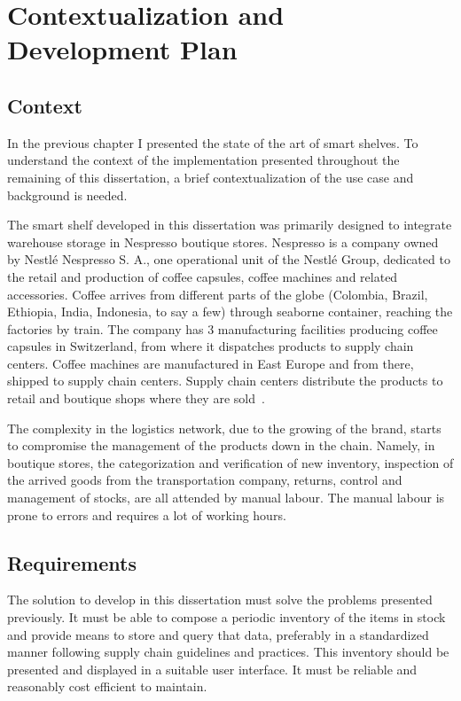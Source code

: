 \chapter{Contextualization and Development Plan}

\section{Context}

In the previous chapter I presented the state of the art of smart shelves. 
To understand the context of the implementation presented throughout the remaining of this dissertation, a brief contextualization of the use case and background is needed.

The smart shelf developed in this dissertation was primarily designed to integrate warehouse storage in Nespresso boutique stores.
Nespresso is a company owned by Nestlé Nespresso S. A., one operational unit of the Nestlé Group, dedicated to the retail and production of coffee capsules, coffee machines and related accessories.
Coffee arrives from different parts of the globe (Colombia, Brazil, Ethiopia, India, Indonesia, to say a few) through seaborne container, reaching the factories by train.
The company has 3 manufacturing facilities producing coffee capsules in Switzerland, from where it dispatches products to supply chain centers.
Coffee machines are manufactured in East Europe and from there, shipped to supply chain centers.
Supply chain centers distribute the products to retail and boutique shops where they are sold~\cite{PortugalRecebeCentro}.

The  complexity  in  the logistics network, due to the growing of the brand, starts to compromise the management of the products down in the chain.
Namely, in boutique stores, the categorization and verification of new inventory, inspection of the arrived goods from the transportation company, returns, control and management of stocks, are all attended by manual labour. The manual labour is prone to errors and requires a lot of working hours.

\section{Requirements}

The solution to develop in this dissertation must solve the problems presented previously.
It must be able to compose a periodic inventory of the items in stock and provide means to store and query that data, preferably in a standardized manner following supply chain guidelines and practices.
This inventory should be presented and displayed in a suitable user interface.
It must be reliable and reasonably cost efficient to maintain.

